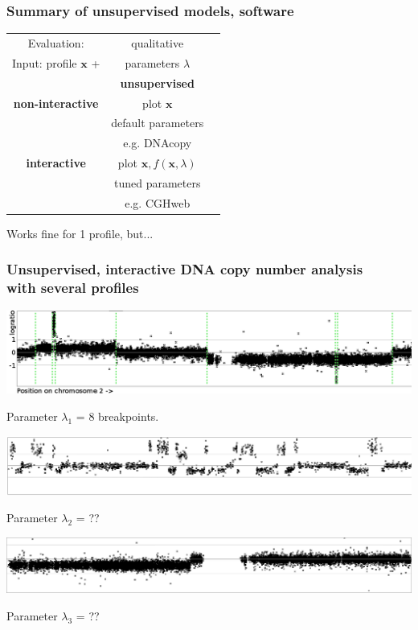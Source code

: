 \documentclass{beamer}
\begin{document}
\begin{frame}
  \frametitle{Summary of unsupervised models, software}

  \begin{center}
  \begin{tabular}{c|c|c}
    Evaluation: & qualitative &  \\
    Input: profile $\mathbf x$ + & parameters $\lambda$ &  \\
        & \textbf{unsupervised} & \\
    \hline
    \textbf{non-interactive}
    & plot $\mathbf x$\\
    & default parameters &  \\
    & e.g. DNAcopy \\
    \hline
    \textbf{interactive}
    & plot $\mathbf x, f(\mathbf x, \lambda)$\\
    & tuned parameters & \\
    & e.g. CGHweb  
  \end{tabular}
  \end{center}

  Works fine for 1 profile, but...

\end{frame}

\begin{frame}
  \frametitle{Unsupervised, interactive DNA copy number analysis\\
  with several profiles}
  \includegraphics[width=\textwidth]{unlabeled-breakpoints-8}

  Parameter $\lambda_1$ = 8 breakpoints.

  \vskip 0.1in

  \includegraphics[width=\textwidth]{lots-of-breaks}

  Parameter $\lambda_2$ = ??

  \vskip 0.1in

  \includegraphics[width=\textwidth]{only-one-break}

  Parameter $\lambda_3$ = ??

\end{frame}
\end{document}
